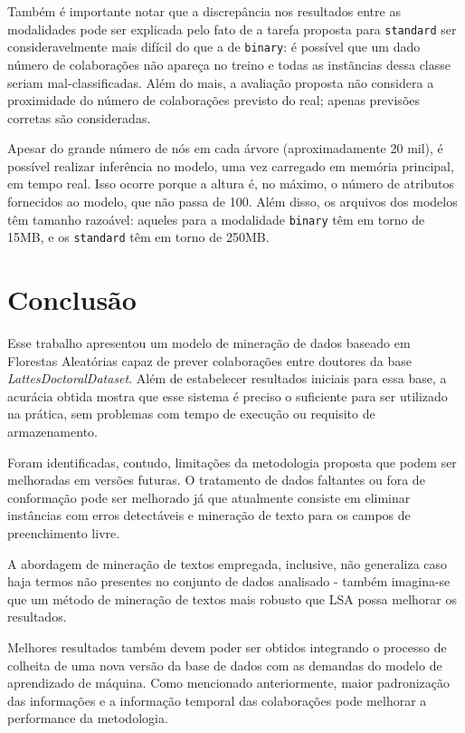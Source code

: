 \documentclass[12pt]{article}
\begin{document}
Também é importante notar que a discrepância nos resultados entre as modalidades pode ser explicada pelo fato de a tarefa proposta para \texttt{standard} ser consideravelmente mais difícil do que a de \texttt{binary}: é possível que um dado número de colaborações não apareça no treino e todas as instãncias dessa classe seriam mal-classificadas.
Além do mais, a avaliação proposta não considera a proximidade do número de colaborações previsto do real; apenas previsões corretas são consideradas.

Apesar do grande número de nós em cada árvore (aproximadamente 20 mil), é possível realizar inferência no modelo, uma vez carregado em memória principal, em tempo real.
Isso ocorre porque a altura é, no máximo, o número de atributos fornecidos ao modelo, que não passa de 100. %
Além disso, os arquivos dos modelos têm tamanho razoável: aqueles para a modalidade \texttt{binary} têm em torno de 15MB, e os \texttt{standard} têm em torno de 250MB.


\section{Conclusão}
\label{sec:conclusion}

Esse trabalho apresentou um modelo de mineração de dados baseado em Florestas Aleatórias capaz de prever colaborações entre doutores da base \emph{LattesDoctoralDataset}.
Além de estabelecer resultados iniciais para essa base, a acurácia obtida mostra que esse sistema é preciso o suficiente para ser utilizado na prática, sem problemas com tempo de execução ou requisito de armazenamento.

Foram identificadas, contudo, limitações da metodologia proposta que podem ser melhoradas em versões futuras.
O tratamento de dados faltantes ou fora de conformação pode ser melhorado já que atualmente consiste em eliminar instâncias com erros detectáveis e mineração de texto para os campos de preenchimento livre.

A abordagem de mineração de textos empregada, inclusive, não generaliza caso haja termos não presentes no conjunto de dados analisado - também imagina-se que um método de mineração de textos mais robusto que LSA possa melhorar os resultados.

Melhores resultados também devem poder ser obtidos integrando o processo de colheita de uma nova versão da base de dados com as demandas do modelo de aprendizado de máquina.
Como mencionado anteriormente, maior padronização das informações e a informação temporal das colaborações pode melhorar a performance da metodologia.

\vspace{-5pt}


\end{document}
